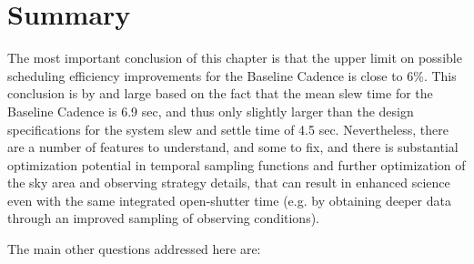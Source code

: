 %
%
%
%
%
%
%
%
%
%
%

\section{Summary}
\def\secname{cadexp:summary}\label{sec:\secname}

The most important conclusion of this chapter is that the upper limit on
possible scheduling efficiency improvements for the Baseline Cadence is
close to 6\%. This conclusion is by and large based on the fact that
the mean slew time for the Baseline Cadence is 6.9 sec, and
thus only slightly larger than the design specifications for the
system slew and settle time of 4.5 sec.  Nevertheless, there are a
number of features to understand, and some to fix, and there is
substantial optimization potential in temporal sampling functions and
further optimization of the sky area and observing strategy details,
that can result in enhanced science even with the same integrated
open-shutter time (e.g. by obtaining deeper data through an improved
sampling of observing conditions).

\vskip 0.2in
The main other questions addressed here are:


